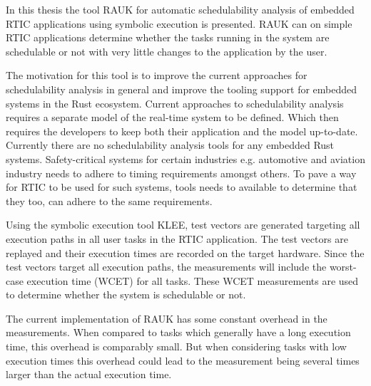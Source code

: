 In this thesis the tool RAUK for automatic schedulability analysis of embedded
RTIC applications using symbolic execution is presented. RAUK can on simple
RTIC applications determine whether the tasks running in the system are
schedulable or not with very little changes to the application by the user.

The motivation for this tool is to improve the current approaches for
schedulability analysis in general and improve the tooling support for embedded
systems in the Rust ecosystem. Current approaches to schedulability analysis
requires a separate model of the real-time system to be defined. Which then
requires the developers to keep both their application and the model
up-to-date.  Currently there are no schedulability analysis tools for any
embedded Rust systems. Safety-critical systems for certain industries e.g.
automotive and aviation industry needs to adhere to timing requirements amongst
others. To pave a way for RTIC to be used for such systems, tools needs to
available to determine that they too, can adhere to the same requirements.

Using the symbolic execution tool KLEE, test vectors are generated targeting
all execution paths in all user tasks in the RTIC application. The test vectors
are replayed and their execution times are recorded on the target hardware.
Since the test vectors target all execution paths, the measurements will
include the worst-case execution time (WCET) for all tasks. These WCET
measurements are used to determine whether the system is schedulable or not.

The current implementation of RAUK has some constant overhead in the
measurements. When compared to tasks which generally have a long execution
time, this overhead is comparably small. But when considering tasks
with low execution times this overhead could lead to the measurement
being several times larger than the actual execution time.

